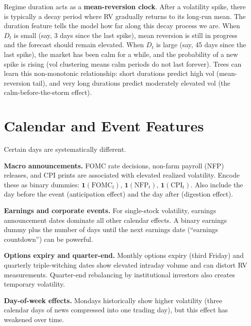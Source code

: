\begin{intuition}
Regime duration acts as a \textbf{mean-reversion clock}.
After a volatility spike, there is typically a decay period where RV gradually returns to its long-run mean.
The duration feature tells the model how far along this decay process we are.
When $D_t$ is small (say, 3 days since the last spike), mean reversion is still in progress and the forecast should remain elevated.
When $D_t$ is large (say, 45 days since the last spike), the market has been calm for a while, and the probability of a new spike is rising (vol clustering means calm periods do not last forever).
Trees can learn this non-monotonic relationship: short durations predict high vol (mean-reversion tail), and very long durations predict moderately elevated vol (the calm-before-the-storm effect).
\end{intuition}

\section{Calendar and Event Features}\label{sec:feat-calendar}

Certain days are systematically different.

\textbf{Macro announcements.}
FOMC rate decisions, non-farm payroll (NFP) releases, and CPI prints are associated with elevated realized volatility.
Encode these as binary dummies: $\mathbf{1}(\text{FOMC}_t)$, $\mathbf{1}(\text{NFP}_t)$, $\mathbf{1}(\text{CPI}_t)$.
Also include the day before the event (anticipation effect) and the day after (digestion effect).

\textbf{Earnings and corporate events.}
For single-stock volatility, earnings announcement dates dominate all other calendar effects.
A binary earnings dummy plus the number of days until the next earnings date (``earnings countdown'') can be powerful.

\textbf{Options expiry and quarter-end.}
Monthly options expiry (third Friday) and quarterly triple-witching dates show elevated intraday volume and can distort RV measurements.
Quarter-end rebalancing by institutional investors also creates temporary volatility.

\textbf{Day-of-week effects.}
Mondays historically show higher volatility (three calendar days of news compressed into one trading day), but this effect has weakened over time.


